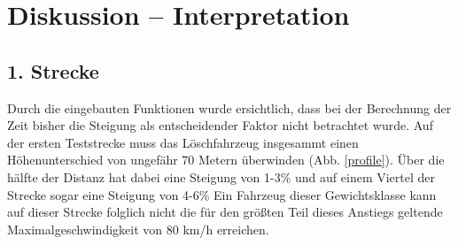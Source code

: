 \documentclass[12pt,a4paper]{article}
\begin{document}
\newpage
\section{Diskussion -- Interpretation}

\subsection{1. Strecke}

Durch die eingebauten Funktionen wurde ersichtlich, dass bei der Berechnung der Zeit bisher die Steigung als entscheidender Faktor nicht betrachtet wurde. Auf der ersten Teststrecke muss das Löschfahrzeug insgesammt einen Höhenunterschied von ungefähr 70 Metern überwinden (Abb. \ref{profile}). Über die hälfte der Distanz hat dabei eine Steigung von 1-3\% und auf einem Viertel der Strecke sogar eine Steigung von 4-6\%  Ein Fahrzeug dieser Gewichtsklasse kann auf dieser Strecke folglich nicht die für den größten Teil dieses Anstiegs geltende Maximalgeschwindigkeit von 80 km/h erreichen.
\end{document}

